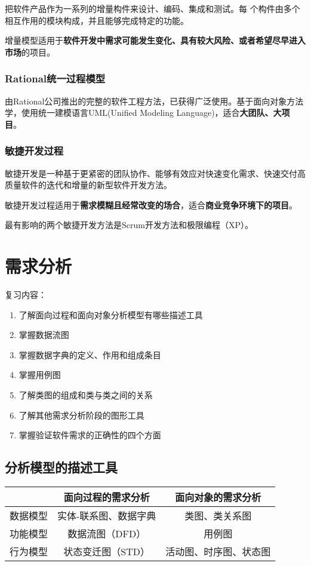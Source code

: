 \documentclass[cn, blue, normal, 12pt]{elegantnote}
\begin{document}
把软件产品作为一系列的增量构件来设计、编码、集成和测试。每
个构件由多个相互作用的模块构成，并且能够完成特定的功能。

增量模型适用于\textbf{软件开发中需求可能发生变化、具有较大风险、或者希望尽早进入市场}的项目。

\subsubsection{Rational统一过程模型}

由Rational公司推出的完整的软件工程方法，已获得广泛使用。基于面向对象方法学，使用统一建模语言UML(Unified Modeling Language)，适合\textbf{大团队、大项目}。

\subsubsection{敏捷开发过程}

敏捷开发是一种基于更紧密的团队协作、能够有效应对快速变化需求、快速交付高质量软件的迭代和增量的新型软件开发方法。

敏捷开发过程适用于\textbf{需求模糊且经常改变的场合}，适合\textbf{商业竞争环境下的项目}。

最有影响的两个敏捷开发方法是Scrum开发方法和极限编程（XP）。

\section{需求分析}

复习内容：

\begin{enumerate}
    \item 了解面向过程和面向对象分析模型有哪些描述工具
    \item 掌握数据流图
    \item 掌握数据字典的定义、作用和组成条目
    \item 掌握用例图
    \item 了解类图的组成和类与类之间的关系
    \item 了解其他需求分析阶段的图形工具
    \item 掌握验证软件需求的正确性的四个方面
\end{enumerate}

\subsection{分析模型的描述工具}

\begin{table}[htbp]
    \centering
    \begin{tabular}{c|c|c}
    \toprule
            & 面向过程的需求分析 & 面向对象的需求分析   \\
    \midrule
    数据模型 & 实体-联系图、数据字典 & 类图、类关系图   \\
    功能模型 & 数据流图（DFD）    & 用例图             \\
    行为模型 & 状态变迁图（STD） & 活动图、时序图、状态图 \\
    \bottomrule
    \end{tabular}
\end{table}
\end{document}

